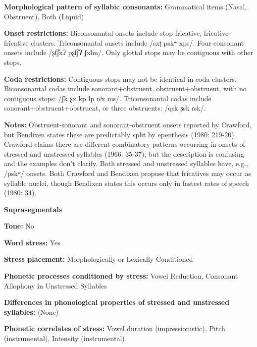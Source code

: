 \textbf{Morphological pattern of syllabic consonants:} Grammatical items (Nasal, Obstruent), Both (Liquid)



\textbf{Onset restrictions:} Biconsonantal onsets include stop-fricative, fricative-fricative clusters. Triconsonantal onsets include /sxʈ pskʷ xps/. Four-consonant onsets include /ʂt͡ʃxʔ pʂt͡ʃʔ ʃxlm/. Only glottal stops may be contiguous with other stops.



\textbf{Coda restrictions:} Contiguous stops may not be identical in coda clusters. Biconsonantal codas include sonorant+obstruent, obstruent+obstruent, with no contiguous stops: /ʃk ʂx kp lp nʲx ms/. Triconsonantal codas include sonorant+obstruent+obstruent, or three obstruents: /qsk ʂsk ɾsk/.



\textbf{Notes:} Obstruent-sonorant and sonorant-obstruent onsets reported by Crawford, but Bendixen states these are predictably split by epenthesis (1980: 219-20). Crawford claims there are different combinatory patterns occurring in onsets of stressed and unstressed syllables (1966: 35-37), but the description is confusing and the examples don’t clarify. Both stressed and unstressed syllables have, e.g., /pskʷ/ onsets. Both Crawford and Bendixen propose that fricatives may occur as syllable nuclei, though Bendixen states this occurs only in fastest rates of speech (1980: 34).



\textbf{Suprasegmentals}



\textbf{Tone:} No



\textbf{Word stress:} Yes



\textbf{Stress placement:} Morphologically or Lexically Conditioned



\textbf{Phonetic processes conditioned by stress:} Vowel Reduction, Consonant Allophony in Unstressed Syllables



\textbf{Differences in phonological properties of stressed and unstressed syllables:} (None)



\textbf{Phonetic correlates of stress:} Vowel duration (impressionistic), Pitch (instrumental), Intensity (instrumental)



